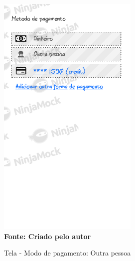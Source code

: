 \begin{figure}[ht]
	\centering	
	\caption[\hspace{0.1cm}]{Tela - Modo de pagamento: Outra pessoa}
	\vspace{-0.4cm}
	\includegraphics[width=0.6\textwidth]{figuras/c_payment.png}
	 \vspace{-0.2cm}
	\\\textbf{\footnotesize Fonte: Criado pelo autor }
	\label{fig:w4}
\end{figure}
\vspace{-0.5cm}

